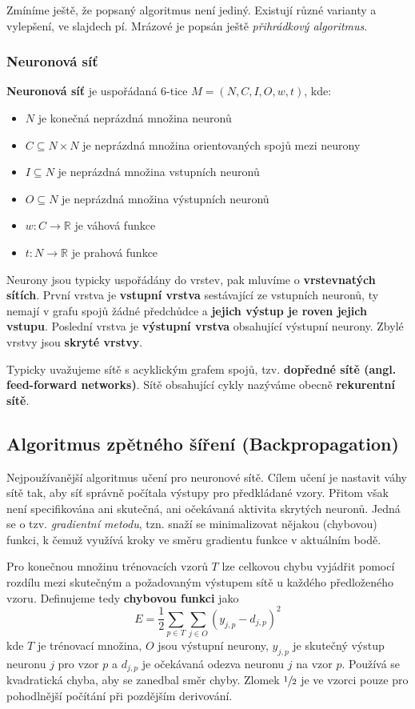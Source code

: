 \documentclass[11pt]{report} %
\newcommand{\R}{\mathbb{R}}
\begin{document}
Zmíníme ještě, že popsaný algoritmus není jediný. Existují různé varianty a vylepšení, ve slajdech pí. Mrázové je popsán ještě \textit{přihrádkový algoritmus}.

\subsubsection{Neuronová síť}
\textbf{Neuronová síť} je uspořádaná 6-tice $M=(N,C,I,O,w,t)$, kde:
\begin{itemize}
	\leftskip 40pt
	\setlength{\itemsep}{0pt}
	\item $N$ je konečná neprázdná množina neuronů
	\item $C \subseteq N \times N$ je neprázdná množina orientovaných spojů mezi neurony
	\item $I \subseteq N$ je neprázdná množina vstupních neuronů
	\item $O \subseteq N$ je neprázdná množina výstupních neuronů
	\item $w: C \rightarrow \R$ je váhová funkce
	\item $t: N \rightarrow \R$ je prahová funkce
\end{itemize}

Neurony jsou typicky uspořádány do vrstev, pak mluvíme o \textbf{vrstevnatých sítích}. První vrstva je \textbf{vstupní vrstva} sestávající ze vstupních neuronů, ty nemají v grafu spojů žádné předchůdce a \textbf{jejich výstup je roven jejich vstupu}. Poslední vrstva je \textbf{výstupní vrstva} obsahující výstupní neurony. Zbylé vrstvy jsou \textbf{skryté vrstvy}. 

Typicky uvažujeme sítě s acyklickým grafem spojů, tzv. \textbf{dopředné sítě (angl. feed-forward networks)}. Sítě obsahující cykly nazýváme obecně \textbf{rekurentní sítě}.

\subsection{Algoritmus zpětného šíření (Backpropagation)}
Nejpoužívanější algoritmus učení pro neuronové sítě. Cílem učení je nastavit váhy sítě tak, aby síť správně počítala výstupy pro předkládané vzory. Přitom však není specifikována ani skutečná, ani očekávaná aktivita skrytých neuronů. Jedná se o tzv. \textit{gradientní metodu}, tzn. snaží se minimalizovat nějakou (chybovou) funkci, k čemuž využívá kroky ve směru gradientu funkce v aktuálním bodě.

Pro konečnou množinu trénovacích vzorů $T$ lze celkovou chybu vyjádřit pomocí rozdílu mezi skutečným a
požadovaným výstupem sítě u každého předloženého vzoru. Definujeme tedy \textbf{chybovou funkci} jako
$$E = \frac{1}{2} \sum\limits_{p \in T}\sum\limits_{j\in O}(y_{j,p} - d_{j,p})^2$$
kde $T$ je trénovací množina, $O$ jsou výstupní neurony, $y_{j,p}$ je skutečný výstup neuronu $j$ pro vzor $p$ a $d_{j,p}$ je očekávaná odezva neuronu $j$ na vzor $p$. Používá se kvadratická chyba, aby se zanedbal směr chyby. Zlomek $\sfrac{1}{2}$ je ve vzorci pouze pro pohodlnější počítání při pozdějším derivování. 
\end{document}
